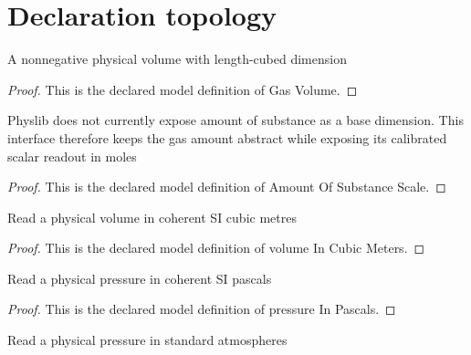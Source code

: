 \section{Declaration topology}
\begin{definition}
  \label{def:physics:phyx-mini-0476:phyxminiproblems-problemphyxmini0476-gasvolume}
  A nonnegative physical volume with length-cubed dimension
\end{definition}
\begin{proof}
  This is the declared model definition of Gas Volume.
\end{proof}
\begin{definition}
  \label{def:physics:phyx-mini-0476:phyxminiproblems-problemphyxmini0476-amountofsubstancescale}
  Physlib does not currently expose amount of substance as a base dimension. This interface therefore keeps the gas amount abstract while exposing its calibrated scalar readout in moles
\end{definition}
\begin{proof}
  This is the declared model definition of Amount Of Substance Scale.
\end{proof}
\begin{definition}
  \label{def:physics:phyx-mini-0476:phyxminiproblems-problemphyxmini0476-volumeincubicmeters}
  Read a physical volume in coherent SI cubic metres
\end{definition}
\begin{proof}
  This is the declared model definition of volume In Cubic Meters.
\end{proof}
\begin{definition}
  \label{def:physics:phyx-mini-0476:phyxminiproblems-problemphyxmini0476-pressureinpascals}
  Read a physical pressure in coherent SI pascals
\end{definition}
\begin{proof}
  This is the declared model definition of pressure In Pascals.
\end{proof}
\begin{definition}
  \label{def:physics:phyx-mini-0476:phyxminiproblems-problemphyxmini0476-pressureinatmospheres}
  Read a physical pressure in standard atmospheres
\end{definition}
